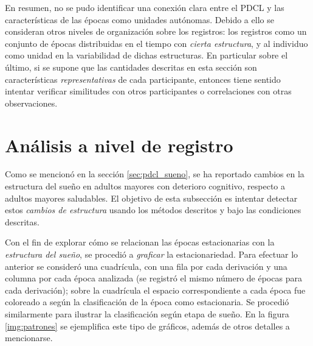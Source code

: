 En resumen, no se pudo identificar una conexión clara entre el PDCL y las características de las épocas como unidades autónomas.
%
Debido a ello se consideran otros niveles de organización sobre los registros: los registros como un conjunto de épocas distribuidas en el tiempo con \textit{cierta estructura}, y al individuo como unidad en la variabilidad de dichas estructuras.
%
En particular sobre el último, si se supone que las cantidades descritas en esta sección son características \textit{representativas} de cada participante, entonces tiene sentido intentar verificar similitudes con otros participantes o correlaciones con otras observaciones.


\section{Análisis a nivel de registro}
\label{sec:analisis_registro}

Como se mencionó en la sección \ref{sec:pdcl_sueno}, se ha reportado cambios en la estructura del sueño en adultos mayores con deterioro cognitivo, respecto a adultos mayores saludables.
%
El objetivo de esta subsección es intentar detectar estos \textit{cambios de estructura} usando los métodos descritos y bajo las condiciones descritas.

Con el fin de explorar cómo se relacionan las épocas estacionarias con la \textit{estructura del sueño}, se procedió a \textit{graficar} la estacionariedad.
%
Para efectuar lo anterior se consideró una cuadrícula, con una fila por cada derivación y una columna por cada época analizada (se registró el mismo número de épocas para cada derivación); sobre la cuadrícula el espacio correspondiente a cada época fue coloreado a según la clasificación de la época como estacionaria.
%
Se procedió similarmente para ilustrar la clasificación según etapa de sueño.
%
En la figura \ref{img:patrones} se ejemplifica este tipo de gráficos, además de otros detalles a mencionarse.


